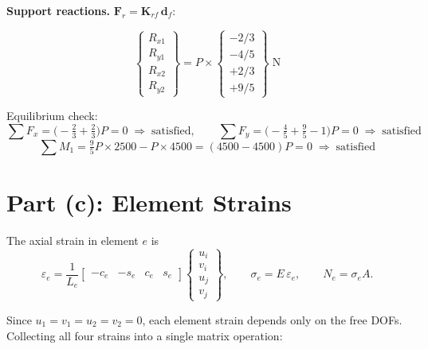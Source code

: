 \documentclass[11pt, a4paper]{article}
\begin{document}
\noindent\textbf{Support reactions.}\; $\mathbf{F}_r = \mathbf{K}_{rf}\,\mathbf{d}_f$:

\begin{equation}\label{eq:reactions}
\begin{Bmatrix} R_{x1} \\ R_{y1} \\ R_{x2} \\ R_{y2} \end{Bmatrix}
= P \times
\begin{Bmatrix}
-2/3 \\
-4/5 \\
+2/3 \\
+9/5
\end{Bmatrix}
\;\text{N}
\end{equation}

\noindent Equilibrium check:
\[
\sum F_x = \bigl(-\tfrac{2}{3}+\tfrac{2}{3}\bigr)P = 0 \;\Rightarrow\; \text{satisfied},\qquad
\sum F_y = \bigl(-\tfrac{4}{5}+\tfrac{9}{5}-1\bigr)P = 0 \;\Rightarrow\; \text{satisfied}
\]
\[
\sum M_1 = \tfrac{9}{5}P\times2500 - P\times4500 = (4500-4500)P = 0 \;\Rightarrow\; \text{satisfied}
\]

\section{Part (c): Element Strains}\label{sec:partc}

The axial strain in element $e$ is
\begin{equation}\label{eq:strain_gen}
\varepsilon_e = \frac{1}{L_e}
\begin{bmatrix} -c_e & -s_e & c_e & s_e \end{bmatrix}
\begin{Bmatrix} u_i \\ v_i \\ u_j \\ v_j \end{Bmatrix},
\qquad
\sigma_e = E\,\varepsilon_e,
\qquad
N_e = \sigma_e A.
\end{equation}

Since $u_1=v_1=u_2=v_2=0$, each element strain depends only on the free DOFs.  Collecting all four strains into a single matrix operation:
\end{document}
